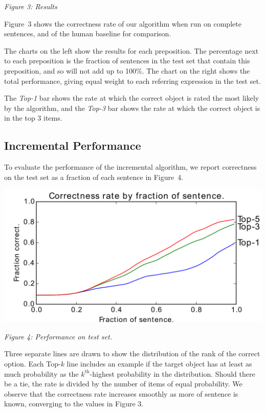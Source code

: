 \documentclass[landscape,a0b]{a0poster}
\numberwithin{equation}{section}
\begin{document}
\begin{multicols*}{3}
\begin{center}
\textit{Figure 3: Results}
\end{center}

\begin{large}

Figure~3 shows the correctness rate of our algorithm when run on complete sentences, and of the human baseline for comparison. 

The charts on the left show the results for each preposition. The percentage next to each preposition is the fraction of sentences in the test set that contain this preposition, and so will not add up to 100\%. The chart on the right shows the total performance, giving equal weight to each referring expression in the test set.

The \emph{Top-1} bar shows the rate at which the correct object is rated the most likely by the algorithm, and the \emph{Top-3} bar shows the rate at which the correct object is in the top 3 items.

\subsection{Incremental Performance}

To evaluate the performance of the incremental algorithm, we report correctness on the test set as a fraction of each sentence in Figure~4.

\end{large}

\begin{center}
  \includegraphics[width=0.7\columnwidth]{eval/cdf_by_fraction}
  
  \textit{Figure 4: Performance on test set.}
\end{center}

\begin{large}

Three separate lines are drawn to show the distribution of the rank of the correct option. Each Top-$k$ line includes an example if the target object has at least as much probability as the $k^\text{th}$-highest probability in the distribution. Should there be a tie, the rate is divided by the number of items of equal probability. We observe that the correctness rate increases smoothly as more of sentence is known, converging to the values in Figure 3.


\end{large}
\end{multicols*}
\end{document}
